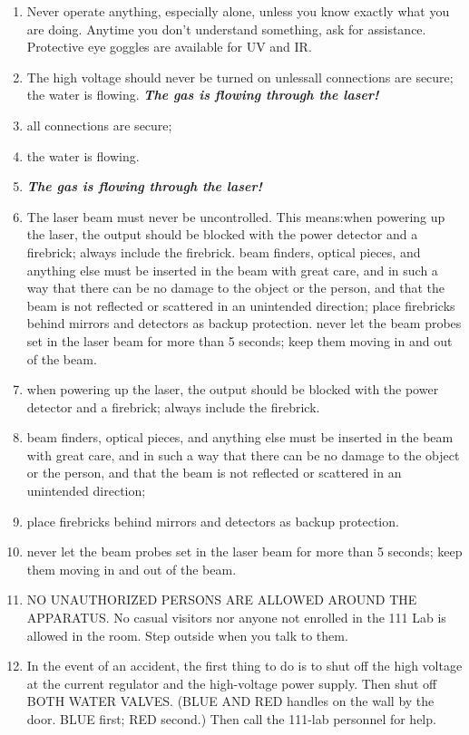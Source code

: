 \documentclass{../lab}
\begin{document}
\begin{enumerate}
    \item Never operate anything, especially alone, unless you know exactly what you are doing. Anytime you don't understand something, ask for assistance. Protective eye goggles are available for UV and IR.
    \item The high voltage should never be turned on unlessall connections are secure;
the water is flowing.
\emph{\textbf{The gas is flowing through the laser!}}

    \item all connections are secure;
    \item the water is flowing.
    \item \emph{\textbf{The gas is flowing through the laser!}}
    \item The laser beam must never be uncontrolled. This means:when powering up the laser, the output should be blocked with the power detector and a firebrick; always include the firebrick.
beam finders, optical pieces, and anything else must be inserted in the beam with great care, and in such a way that there can be no damage to the object or the person, and that the beam is not reflected or scattered in an unintended direction;
place firebricks behind mirrors and detectors as backup protection.
never let the beam probes set in the laser beam for more than 5 seconds; keep them moving in and out of the beam.

    \item when powering up the laser, the output should be blocked with the power detector and a firebrick; always include the firebrick.
    \item beam finders, optical pieces, and anything else must be inserted in the beam with great care, and in such a way that there can be no damage to the object or the person, and that the beam is not reflected or scattered in an unintended direction;
    \item place firebricks behind mirrors and detectors as backup protection.
    \item never let the beam probes set in the laser beam for more than 5 seconds; keep them moving in and out of the beam.
    \item NO UNAUTHORIZED PERSONS ARE ALLOWED AROUND THE APPARATUS. No casual visitors nor anyone not enrolled in the 111 Lab is allowed in the room. Step outside when you talk to them.
    \item In the event of an accident, the first thing to do is to shut off the high voltage at the current regulator and the high-voltage power supply. Then shut off BOTH WATER VALVES. (BLUE AND RED handles on the wall by the door. BLUE first; RED second.) Then call the 111-lab personnel for help.
\end{enumerate}
\end{document}
